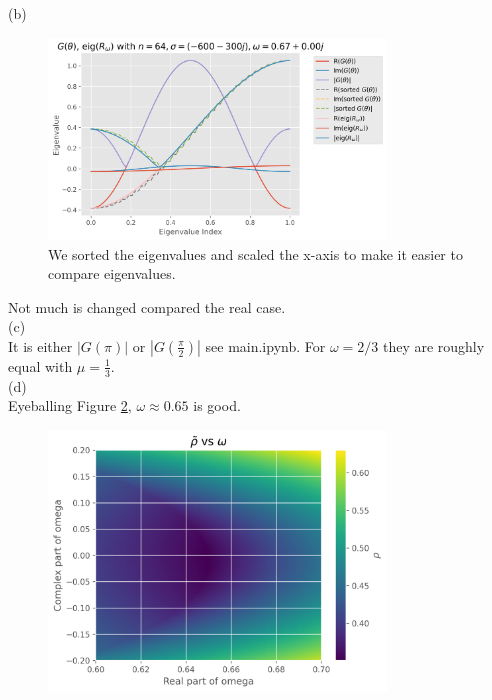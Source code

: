 \documentclass[a4paper,12pt]{article}
\begin{document}
(b) \\
\begin{figure}[h!]
    \centering
    \includegraphics[width=0.8\textwidth]{../code/plts/eigenvalues_1DcomplexG.png}
    \caption{We sorted the eigenvalues and scaled the x-axis to make it easier to compare eigenvalues.}
    \label{fig:eigen complex G 1D}
\end{figure}
Not much is changed compared the real case. \\
(c) \\
It is either $|G(\pi)|$ or $|G(\frac{\pi}{2})|$
see main.ipynb. For $\omega = 2/3$ they are roughly equal with $\mu = \frac{1}{3}$.\\
(d) \\
Eyeballing Figure \ref{fig:rho omega 1D complex}, $\omega \approx 0.65$ is good.
\begin{figure}[h!]
    \centering
    \includegraphics[width=0.8\textwidth]{../code/plts/rho_omega_1Dcomplex.png}
    \caption{}
    \label{fig:rho omega 1D complex}
\end{figure}
\end{document}
